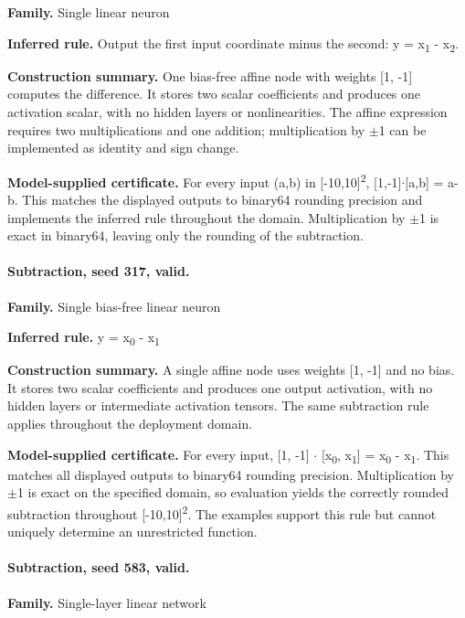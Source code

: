 \textbf{Family.} Single linear neuron


\textbf{Inferred rule.} Output the first input coordinate minus the second: y = x\textsubscript{1} - x\textsubscript{2}.


\textbf{Construction summary.} One bias-free affine node with weights [1, -1] computes the difference. It stores two scalar coefficients and produces one activation scalar, with no hidden layers or nonlinearities. The affine expression requires two multiplications and one addition; multiplication by \ensuremath{\pm}1 can be implemented as identity and sign change.


\textbf{Model-supplied certificate.} For every input (a,b) in [-10,10]\textsuperscript{2}, [1,-1]\ensuremath{\cdot}[a,b] = a-b. This matches the displayed outputs to binary64 rounding precision and implements the inferred rule throughout the domain. Multiplication by \ensuremath{\pm}1 is exact in binary64, leaving only the rounding of the subtraction.


\paragraph{Subtraction, seed 317, valid.}

\textbf{Family.} Single bias-free linear neuron


\textbf{Inferred rule.} y = x\textsubscript{0} - x\textsubscript{1}


\textbf{Construction summary.} A single affine node uses weights [1, -1] and no bias. It stores two scalar coefficients and produces one output activation, with no hidden layers or intermediate activation tensors. The same subtraction rule applies throughout the deployment domain.


\textbf{Model-supplied certificate.} For every input, [1, -1] \ensuremath{\cdot} [x\textsubscript{0}, x\textsubscript{1}] = x\textsubscript{0} - x\textsubscript{1}. This matches all displayed outputs to binary64 rounding precision. Multiplication by \ensuremath{\pm}1 is exact on the specified domain, so evaluation yields the correctly rounded subtraction throughout [-10,10]\textsuperscript{2}. The examples support this rule but cannot uniquely determine an unrestricted function.


\paragraph{Subtraction, seed 583, valid.}

\textbf{Family.} Single-layer linear network


